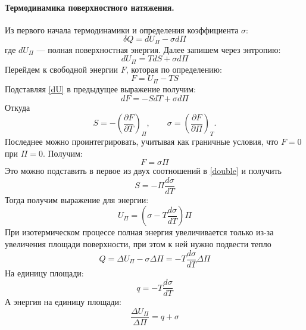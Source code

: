 \documentclass[a4paper,12pt]{report}
\begin{document}
\begin{multicols}{2}
        \paragraph*{Термодинамика поверхностного натяжения.}
        Из первого начала термодинамики и определения коэффициента $\sigma$:
        \begin{equation*}
            \delta Q = dU_\Pi - \sigma d\Pi
        \end{equation*}
        где $dU_\Pi$ --- полная поверхностная энергия. Далее запишем через энтропию:
        \begin{equation}
            dU_\Pi = TdS+\sigma d\Pi
            \label{dU}
        \end{equation}
        Перейдем к свободной энергии $F$, которая по определению:
        \begin{equation}
            F=U_\Pi-TS
        \end{equation}
        Подставляя \eqref{dU} в предыдущее выражение получим:
        \begin{equation}
            dF=-SdT+\sigma d\Pi
        \end{equation}
        Откуда
        \begin{equation}
            \label{double}
            S=-\left(\frac{\partial F}{\partial T}\right)_\Pi, \qquad \sigma = \left(\frac{\partial F}{\partial \Pi}\right)_T.
        \end{equation}
        Последнее можно проинтегрировать, учитывая как граничные условия, что $F=0$ при $\Pi = 0$. Получим:
        \begin{equation}
            F=\sigma\Pi
        \end{equation}
        Это можно подставить в первое из двух соотношений в \eqref{double} и получить
        \begin{equation*}
            S=-\Pi \frac{d\sigma}{dT}
        \end{equation*}
        Тогда получим выражение для энергии:
        \begin{equation}
            U_\Pi=\left(\sigma-T\frac{d\sigma}{dT}\right)\Pi
        \end{equation}
        При изотермическом процессе полная энергия увеличивается только из-за увеличения площади поверхности, при этом к ней нужно подвести тепло
        \begin{equation*}
            Q=\Delta U_\Pi - \sigma \Delta \Pi = -T\frac{d\sigma}{dT}\Delta\Pi
        \end{equation*}
        На единицу площади:
        \begin{equation*}
            q=-T\frac{d\sigma}{dT}
        \end{equation*}
        А энергия на единицу площади:
        \begin{equation*}
            \frac{\Delta U_\Pi}{\Delta\Pi}=q+\sigma
        \end{equation*}
        \newcolumn

\end{multicols}
\end{document}
